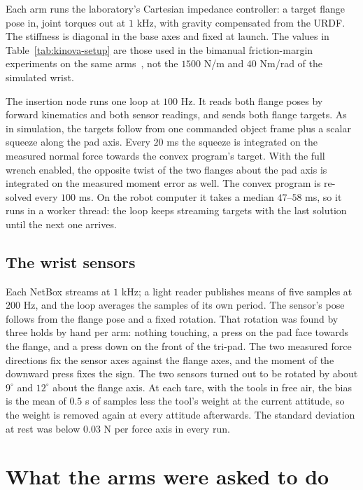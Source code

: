 Each arm runs the laboratory's Cartesian impedance controller: a target flange pose in, joint torques out at $1$ kHz, with gravity compensated from the URDF. The stiffness is diagonal in the base axes and fixed at launch. The values in Table~\ref{tab:kinova-setup} are those used in the bimanual friction-margin experiments on the same arms~\cite{frictioncone2026}, not the $1500$ N/m and $40$ Nm/rad of the simulated wrist.

The insertion node runs one loop at $100$ Hz. It reads both flange poses by forward kinematics and both sensor readings, and sends both flange targets. As in simulation, the targets follow from one commanded object frame plus a scalar squeeze along the pad axis. Every $20$ ms the squeeze is integrated on the measured normal force towards the convex program's target. With the full wrench enabled, the opposite twist of the two flanges about the pad axis is integrated on the measured moment error as well. The convex program is re-solved every $100$ ms. On the robot computer it takes a median $47$--$58$ ms, so it runs in a worker thread: the loop keeps streaming targets with the last solution until the next one arrives.

\subsection{The wrist sensors}

Each NetBox streams at $1$ kHz; a light reader publishes means of five samples at $200$ Hz, and the loop averages the samples of its own period. The sensor's pose follows from the flange pose and a fixed rotation. That rotation was found by three holds by hand per arm: nothing touching, a press on the pad face towards the flange, and a press down on the front of the tri-pad. The two measured force directions fix the sensor axes against the flange axes, and the moment of the downward press fixes the sign. The two sensors turned out to be rotated by about $9^\circ$ and $12^\circ$ about the flange axis. At each tare, with the tools in free air, the bias is the mean of $0.5$ s of samples less the tool's weight at the current attitude, so the weight is removed again at every attitude afterwards. The standard deviation at rest was below $0.03$ N per force axis in every run.

\section{What the arms were asked to do}

